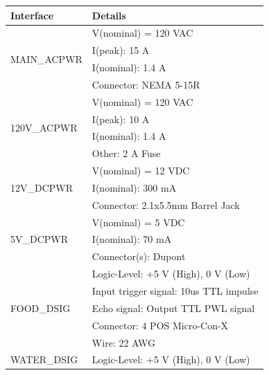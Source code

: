 \documentclass{article}
\begin{document}
\begin{longtable}{|l|l|} 
\hline
Interface                        & Details                                   \\* 
\hline
\multirow{4}{*}{MAIN\_ACPWR}     & V(nominal) = 120 VAC                      \\*
                                 & I(peak): 15 A                             \\*
                                 & I(nominal): 1.4 A                         \\*
                                 & Connector: NEMA 5-15R                     \\* 
\hline
\multirow{4}{*}{120V\_ACPWR}     & V(nominal) = 120 VAC                      \\*
                                 & I(peak): 10 A                             \\*
                                 & I(nominal): 1.4 A                         \\*
                                 & Other: 2 A Fuse                           \\* 
\hline
\multirow{3}{*}{12V\_DCPWR}      & V(nominal) = 12 VDC                       \\*
                                 & I(nominal): 300 mA                        \\*
                                 & Connector: 2.1x5.5mm Barrel Jack          \\* 
\hline
\multirow{3}{*}{5V\_DCPWR}       & V(nominal) = 5 VDC                        \\*
                                 & I(nominal): 70 mA                         \\*
                                 & Connector(s): Dupont                      \\* 
\hline
\multirow{5}{*}{FOOD\_DSIG}      & Logic-Level: +5 V (High), 0 V (Low)       \\*
                                 & Input trigger signal: 10us TTL impulse    \\*
                                 & Echo signal: Output TTL PWL signal        \\*
                                 & Connector: 4 POS Micro-Con-X              \\*
                                 & Wire: 22 AWG                              \\* 
\hline
\multirow{5}{*}{WATER\_DSIG}     & Logic-Level: +5 V (High), 0 V (Low)       \\*

\end{longtable}
\end{document}
